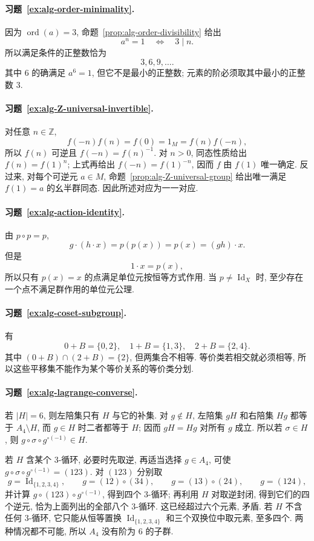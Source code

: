 \documentclass[usesamecnt, thmcnt=section, lang=cn, newtx, 10pt, scheme=chinese]{elegantbook}
\begin{document}
\paragraph*{习题~\ref{ex:alg-order-minimality}.}
因为 $\operatorname{ord}(a)=3$, 命题~\ref{prop:alg-order-divisibility} 给出
\[
 a^n=1
 \quad\Longleftrightarrow\quad
 3\mid n.
\]
所以满足条件的正整数恰为
\[
 3,6,9,\ldots.
\]
其中 $6$ 的确满足 $a^6=1$, 但它不是最小的正整数; 元素的阶必须取其中最小的正整数 $3$.

\paragraph*{习题~\ref{ex:alg-Z-universal-invertible}.}
对任意 $n\in\mathbb Z$,
\[
 f(-n)f(n)=f(0)=1_M=f(n)f(-n),
\]
所以 $f(n)$ 可逆且 $f(-n)=f(n)^{-1}$. 对 $n>0$, 同态性质给出 $f(n)=f(1)^n$; 上式再给出 $f(-n)=f(1)^{-n}$, 因而 $f$ 由 $f(1)$ 唯一确定. 反过来, 对每个可逆元 $a\in M$, 命题~\ref{prop:alg-Z-universal-group} 给出唯一满足 $f(1)=a$ 的幺半群同态. 因此所述对应为一一对应.


\paragraph*{习题~\ref{ex:alg-action-identity}.}
由 $p\circ p=p$,
\[
 g\cdot(h\cdot x)=p(p(x))=p(x)=(gh)\cdot x.
\]
但是
\[
 1\cdot x=p(x),
\]
所以只有 $p(x)=x$ 的点满足单位元按恒等方式作用. 当 $p\neq\operatorname{Id}_X$ 时, 至少存在一个点不满足群作用的单位元公理.

\paragraph*{习题~\ref{ex:alg-coset-subgroup}.}
有
\[
 0+B=\{0,2\},\quad
 1+B=\{1,3\},\quad
 2+B=\{2,4\}.
\]
其中 $(0+B)\cap(2+B)=\{2\}$, 但两集合不相等. 等价类若相交就必须相等, 所以这些平移集不能作为某个等价关系的等价类分划.

\paragraph*{习题~\ref{ex:alg-lagrange-converse}.}
若 $|H|=6$, 则左陪集只有 $H$ 与它的补集. 对 $g\notin H$, 左陪集 $gH$ 和右陪集 $Hg$ 都等于 $A_4\setminus H$, 而 $g\in H$ 时二者都等于 $H$; 因而 $gH=Hg$ 对所有 $g$ 成立. 所以若 $\sigma\in H$, 则 $g\circ\sigma\circ g^{\circ(-1)}\in H$.

若 $H$ 含某个 $3$-循环, 必要时先取逆, 再适当选择 $g\in A_4$, 可使 $g\circ\sigma\circ g^{\circ(-1)}=(123)$. 对 $(123)$ 分别取
\[
 g=\operatorname{Id}_{\{1,2,3,4\}},\qquad g=(12)\circ(34),\qquad g=(13)\circ(24),\qquad g=(124),
\]
并计算 $g\circ(123)\circ g^{\circ(-1)}$, 得到四个 $3$-循环; 再利用 $H$ 对取逆封闭, 得到它们的四个逆元, 恰为上面列出的全部八个 $3$-循环. 这已经超过六个元素, 矛盾. 若 $H$ 不含任何 $3$-循环, 它只能从恒等置换 $\operatorname{Id}_{\{1,2,3,4\}}$ 和三个双换位中取元素, 至多四个. 两种情况都不可能, 所以 $A_4$ 没有阶为 $6$ 的子群.
\end{document}
